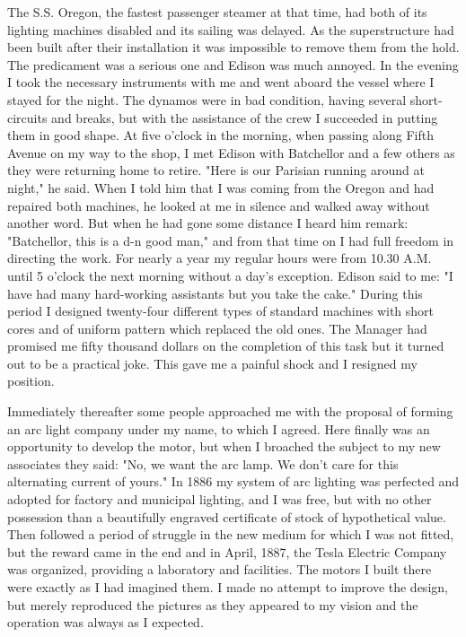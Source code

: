 \documentclass[a4paper,12pt,english,twoside,openright]{memoir}
\begin{document}
The S.S. Oregon, the fastest passenger steamer at that time, had both of its lighting machines 
disabled and its sailing was delayed.  As the superstructure had been built after their installation it 
was impossible to remove them from the hold.  The predicament was a serious one and Edison 
was much annoyed.  In the evening I took the necessary instruments with me and went aboard 
the vessel where I stayed for the night.  The dynamos were in bad condition, having several 
short-circuits and breaks, but with the assistance of the crew I succeeded in putting them in good 
shape.  At five o'clock in the morning, when passing along Fifth Avenue on my way to the shop, I 
met Edison with Batchellor and a few others as they were returning home to retire.  "Here is our 
Parisian running around at night," he said.  When I told him that I was coming from the Oregon 
and had repaired both machines, he looked at me in silence and walked away without another 
word.  But when he had gone some distance I heard him remark: "Batchellor, this is a d-n good 
man," and from that time on I had full freedom in directing the work.  For nearly a year my regular 
hours were from 10.30 A.M.  until 5 o'clock the next morning without a day's exception.  Edison 
said to me: "I have had many hard-working assistants but you take the cake." During this period I 
designed twenty-four different types of standard machines with short cores and of uniform pattern 
which replaced the old ones.  The Manager had promised me fifty thousand dollars on the completion of this  task but it turned out to be a practical joke.  This gave me a painful shock and I resigned my position.  


Immediately thereafter some people approached me with the proposal of forming an arc light 
company under my name, to which I agreed.  Here finally was an opportunity to develop the 
motor, but when I broached the subject to my new associates they said: "No, we want the arc 
lamp.  We don't care for this alternating current of yours." In 1886 my system of arc lighting was 
perfected and adopted for factory and municipal lighting, and I was free, but with no other 
possession than a beautifully engraved certificate of stock of hypothetical value.  Then followed a 
period of struggle in the new medium for which I was not fitted, but the reward came in the end 
and in April, 1887, the Tesla Electric Company was organized, providing a laboratory and 
facilities.  The motors I built there were exactly as I had imagined them.  I made no attempt to 
improve the design, but merely reproduced the pictures as they appeared to my vision and the 
operation was always as I expected.  
\end{document}
